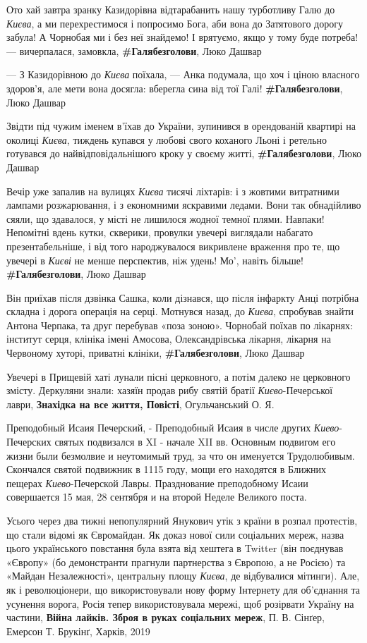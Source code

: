 Ото хай завтра зранку Казидорівна відтарабанить нашу турботливу Галю до \emph{Києва},
а ми перехрестимося і попросимо Бога, аби вона до Затятового дорогу забула! А
Чорнобая ми і без неї знайдемо! І врятуємо, якщо у тому буде потреба! —
вичерпалася, замовкла,
\textbf{\#Галябезголови}, Люко Дашвар

— З Казидорівною до \emph{Києва} поїхала, — Анка подумала, що хоч і ціною власного
здоров'я, але мети вона досягла: вберегла сина від тої Галі!
\textbf{\#Галябезголови}, Люко Дашвар

Звідти під чужим іменем в'їхав до України, зупинився в орендованій квартирі на
околиці \emph{Києва}, тиждень купався у любові свого коханого Льоні і ретельно
готувався до найвідповідальнішого кроку у своєму житті, 
\textbf{\#Галябезголови}, Люко Дашвар

Вечір уже запалив на вулицях \emph{Києва} тисячі ліхтарів: і з жовтими витратними
лампами розжарювання, і з економними яскравими ледами. Вони так обнадійливо
сяяли, що здавалося, у місті не лишилося жодної темної плями. Навпаки!
Непомітні вдень кутки, скверики, провулки увечері виглядали набагато
презентабельніше, і від того народжувалося викривлене враження про те, що
увечері в \emph{Києві} не менше перспектив, ніж удень! Мо', навіть більше!
\textbf{\#Галябезголови}, Люко Дашвар

Він приїхав після дзвінка Сашка, коли дізнався, що після інфаркту Анці потрібна
складна і дорога операція на серці. Мотнувся назад, до \emph{Києва}, спробував
знайти Антона Черпака, та друг перебував «поза зоною». Чорнобай поїхав по
лікарнях: інститут серця, клініка імені Амосова, Олександрівська лікарня,
лікарня на Червоному хуторі, приватні клініки, 
\textbf{\#Галябезголови}, Люко Дашвар

Увечері в Прищевій хаті лунали пісні церковного, а потім далеко не церковного
змісту. Деркуляни знали: хазяїн продав рибу святій братії
\emph{Києво}-Печерської лаври, \textbf{Знахідка на все життя, Повісті},
Огульчанський О. Я.  

Преподобный Исаия Печерский, - Преподобный Исаия в числе других
\emph{Киево}-Печерских святых подвизался в XI - начале XII вв. Основным
подвигом его жизни были безмолвие и неутомимый труд, за что он именуется
Трудолюбивым. Скончался святой подвижник в 1115 году, мощи его находятся в
Ближних пещерах \emph{Киево}-Печерской Лавры. Празднование преподобному Исаии
совершается 15 мая, 28 сентября и на второй Неделе Великого поста.

Усього через два тижні непопулярний Янукович утік з країни в розпал протестів,
що стали відомі як Євромайдан. Як доказ нової сили соціальних мереж, назва
цього українського повстання була взята від хештега в Twitter (він поєднував
«Європу» (бо демонстранти прагнули партнерства з Європою, а не Росією) та
«Майдан Незалежності», центральну площу \emph{Києва}, де відбувалися мітинги).
Але, як і революціонери, що використовували нову форму Інтернету для об'єднання
та усунення ворога, Росія тепер використовувала мережі, щоб розірвати Україну
на частини, \textbf{Війна лайків. Зброя в руках соціальних мереж}, П. В.
Сінґер, Емерсон Т. Брукінґ, Харків, 2019

